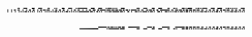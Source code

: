 \documentclass[10pt]{article}
\theoremstyle{plain}
\theoremstyle{definition}
\begin{document}
\begin{table*}[b]
{\begin{minipage}{5.32in}
\[\begin{array}{@{}r@{}}
\begin{array}{@{}l@{}}
\a\a\a\a\a\a\a\a\a\a\a\a\a\a\b\b\a\a\a\a\b\b\b\b\a\a\a\a\a\b\b\b\a\a\a\a \b\b\b\b\a\a\a\a\a\a\b\b\a\a\a\a\a\b\a\b\a\a\a\a\a\b\b\b\a\a\a\a\b\b\b\b \a\a\a\a\b\a\b\b\b\b\b\b\b\b\b\b\a\a\a\a\b\b\b\b\a\a\a\a\b\b\b\b\a\a\a\a \b\a\b\b\b\b\a\b\a\b\a\b\a\a\a\a\b\b\b\b\a\a\a\a\a\a\a\a\a\a\a\a\a\b\b\b \a\a\a\a\b\b\b\b\a\a\a\a\a\b\b\b\a\a\a\a\b\b\b\b\a\a\a\a\a\a\b\b\a\a\a\a \b\b\a\b\a\a\a\a\a\b\b\b\a\b\a\b\b\b\b\b\a\a\a\a\b\a\b\b\a\b\a\b\b\b\b\b \a\a\a\a\b\b\b\b\a\a\a\b\b\b\b\b\a\a\a\a\b\a\b\b\a\b\a\b\a\b\a\b\a\a\a\a \b\b\b\b\mynl
\a\a\a\b\a\a\a\b\a\a\b\b\a\a\b\b\a\a\a\b\a\a\a\b\a\a\b\b\a\a\b\b\a\a\a\b \a\a\b\b\a\b\b\b\a\b\b\b\a\a\a\b\a\a\b\b\a\a\b\b\a\a\b\b\a\a\a\b\a\a\a\b \a\a\b\b\a\a\b\b\a\a\a\b\a\a\a\b\a\a\b\b\a\a\b\b\b\a\a\b\b\a\b\b\b\b\b\b \a\b\b\b\b\a\b\b\b\a\b\b\b\a\b\b\b\a\b\b\a\b\b\b\a\b\a\b\b\b\b\b\b\a\b\b \a\a\b\b\a\a\a\b\b\a\b\b\b\a\b\b\a\a\b\b\a\a\b\b\b\b\b\b\b\b\b\b\a\a\b\b \a\a\b\b\b\a\b\b\b\a\b\b\a\b\b\b\a\b\b\b\a\b\b\b\a\b\b\b\a\a\b\b\a\a\a\b \a\a\b\b\a\a\b\b\a\a\b\b\a\a\b\b\a\b\b\b\a\b\b\b\a\a\b\b\a\a\b\b\a\a\b\b \a\a\b\b\mynl
\a\a\a\b\a\a\a\b\a\a\a\b\a\a\a\b\a\b\a\b\a\b\b\b\a\b\a\b\a\b\a\b\a\a\a\b \a\b\a\b\a\a\a\b\a\b\a\b\a\b\a\b\a\b\b\b\a\b\a\b\a\b\a\b\a\b\b\b\a\b\a\b \a\b\a\b\a\b\a\b\b\b\b\b\b\b\b\b\b\b\a\b\b\b\a\b\a\a\b\b\a\b\a\b\a\a\a\b \a\b\a\b\b\b\a\b\b\b\b\b\b\b\a\b\b\b\a\b\a\a\a\b\b\a\a\b\a\a\a\b\b\b\a\b \a\b\a\b\b\b\b\b\a\b\a\b\b\b\a\b\a\a\a\b\b\b\a\b\a\a\a\b\b\b\a\b\a\b\a\b \a\b\b\b\a\b\a\b\b\b\a\b\a\b\b\b\a\b\a\b\a\b\a\b\a\b\a\b\a\b\b\b\a\b\b\b \a\b\a\b\a\b\a\b\a\b\b\b\a\b\a\b\a\a\a\b\a\b\a\b\a\b\b\b\a\b\b\b\a\b\a\b \a\b\a\b
\end{array}
\mynnl
\begin{array}{@{}l@{}}
\a\a\a\a\a\a\a\a\a\a\a\a\a\a\a\a\a\a\a\a\a\a\a\a\a\a\a\a\a\a\a\a\a\a\a\a \a\a\a\a\a\a\a\a\a\a\a\a\a\a\a\a\a\a\a\a\a\a\a\a\a\a\a\a\a\a\a\a\a\a\a\a \a\a\a\a\a\a\a\a\a\a\a\a\a\a\a\a\a\a\a\a\a\a\a\a\a\a\a\a\b\b\b\b\b\b\b\b \b\a\b\b\a\b\b\b\a\b\a\b\a\b\b\b\a\b\b\b\a\a\a\a\b\b\b\b\b\b\b\b\b\b\b\b \a\a\a\a\a\a\a\a\b\b\b\b\b\a\b\b\a\a\a\a\a\a\a\a\b\b\b\b\b\b\b\b\a\a\a\a \a\a\b\b\b\b\b\b\b\b\b\b\a\b\b\b\a\b\b\b\a\b\b\b\a\b\b\b\a\a\b\b\a\a\a\b \a\a\b\b\a\a\b\b\a\a\b\b\a\a\b\b\a\b\b\b\a\b\b\b\a\a\b\b\a\a\b\b\a\a\b\b \a\a\b\b\mynl
\a\a\a\a\a\a\a\a\a\a\a\a\a\a\a\a\a\a\a\a\a\a\a\a\a\a\a\a\a\a\a\a\a\a\a\a \a\a\a\a\a\a\a\a\a\a\a\a\a\a\a\a\a\a\a\a\a\a\a\a\a\a\a\a\a\a\a\a\a\a\a\a \a\a\a\a\a\a\a\a\b\b\b\b\b\b\b\b\b\b\b\b\b\b\b\b\b\b\b\b\a\a\a\a\a\a\a\a \a\b\a\b\b\b\b\b\b\b\b\b\b\b\a\b\b\b\b\b\a\a\a\a\a\a\a\a\a\a\a\a\a\b\b\b \a\a\a\a\b\b\b\b\a\a\a\a\a\b\b\b\a\a\a\a\b\b\b\b\a\a\a\a\a\a\b\b\a\a\a\a \b\b\a\b\a\a\a\a\a\b\b\b\a\b\b\b\a\b\a\b\a\b\a\b\a\b\a\b\a\b\b\b\a\b\b\b \a\b\a\b\a\b\a\b\a\b\b\b\a\b\a\b\a\a\a\b\a\b\a\b\a\b\b\b\a\b\b\b\a\b\a\b \a\b\a\b\mynl

\end{array}
\end{array}\]
\end{minipage}}
\end{table*}
\end{document}
